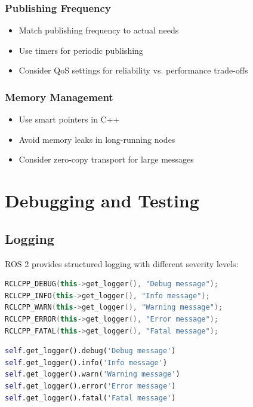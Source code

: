 \documentclass[a4paper,12pt]{book}
\begin{document}
\subsection{Publishing Frequency}
\begin{itemize}
\item Match publishing frequency to actual needs
\item Use timers for periodic publishing
\item Consider QoS settings for reliability vs. performance trade-offs
\end{itemize}

\subsection{Memory Management}
\begin{itemize}
\item Use smart pointers in C++
\item Avoid memory leaks in long-running nodes
\item Consider zero-copy transport for large messages
\end{itemize}

\chapter{Debugging and Testing}

\section{Logging}

ROS 2 provides structured logging with different severity levels:

\begin{lstlisting}[language=CPP, caption=Logging in C++]
RCLCPP_DEBUG(this->get_logger(), "Debug message");
RCLCPP_INFO(this->get_logger(), "Info message");
RCLCPP_WARN(this->get_logger(), "Warning message");
RCLCPP_ERROR(this->get_logger(), "Error message");
RCLCPP_FATAL(this->get_logger(), "Fatal message");
\end{lstlisting}

\begin{lstlisting}[language=Python, caption=Logging in Python]
self.get_logger().debug('Debug message')
self.get_logger().info('Info message')
self.get_logger().warn('Warning message')
self.get_logger().error('Error message')
self.get_logger().fatal('Fatal message')
\end{lstlisting}
\end{document}
